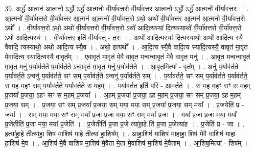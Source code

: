 \documentclass[17pt]{extarticle}
\begin{document}
39. अर्द्ध॑ आ॒त्मन॑ आ॒त्मनो ऽर्द्धो ऽर्द्ध॑ आ॒त्मनो॑ वी॒र्या॑वत्तरो वी॒र्या॑वत्तर आ॒त्मनो ऽर्द्धो ऽर्द्ध॑ आ॒त्मनो॑ वी॒र्या॑वत्तरः । . आ॒त्मनो॑ वी॒र्या॑वत्तरो वी॒र्या॑वत्तर आ॒त्मन॑ आ॒त्मनो॑ वी॒र्या॑वत्त॒रो ऽथो॒ अथो॑ वी॒र्या॑वत्तर आ॒त्मन॑ आ॒त्मनो॑ वी॒र्या॑वत्त॒रो ऽथो᳚ । . वी॒र्या॑वत्त॒रो ऽथो॒ अथो॑ वी॒र्या॑वत्तरो वी॒र्या॑वत्त॒रो ऽथो॑ आदि॒त्यस्या॑ दि॒त्यस्याथो॑ वी॒र्या॑वत्तरो वी॒र्या॑वत्त॒रो ऽथो॑ आदि॒त्यस्य॑ । . वी॒र्या॑वत्तर॒ इति॑ वी॒र्या॑वत् - त॒रः॒ । . अथो॑ आदि॒त्यस्या॑ दि॒त्यस्याथो॒ अथो॑ आदि॒त्य स्यै॒ वैवादि॒ त्यस्याथो॒ अथो॑ आदि॒त्य स्यै॒व । . अथो॒ इत्यथो᳚ । . आ॒दि॒त्य स्यै॒वै वादि॒त्य स्या॑दि॒त्यस्यै॒ वावृत॑ मा॒वृत॑ मे॒वादि॒त्य स्या॑दि॒त्यस्यै॒ वावृत᳚म् । . ए॒वावृत॑ मा॒वृत॑ मे॒वै वावृत॒ मन्वन्वा॒वृत॑ मे॒वै वावृत॒ मनु॑ । . आ॒वृत॒ मन्वन्वा॒वृत॑ मा॒वृत॒ मनु॑ प॒र्याव॑र्तते प॒र्याव॑र्त॒ते ऽन्वा॒वृत॑ मा॒वृत॒ मनु॑ प॒र्याव॑र्तते । . आ॒वृत॒मित्या᳚ - वृत᳚म् । . अनु॑ प॒र्याव॑र्तते प॒र्याव॑र्त॒ते ऽन्वनु॑ प॒र्याव॑र्तते॒ सꣳ सम् प॒र्याव॑र्त॒ते ऽन्वनु॑ प॒र्याव॑र्तते॒ सम् । . प॒र्याव॑र्तते॒ सꣳ सम् प॒र्याव॑र्तते प॒र्याव॑र्तते॒ स म॒ह म॒हꣳ सम् प॒र्याव॑र्तते प॒र्याव॑र्तते॒ स म॒हम् । . प॒र्याव॑र्तत॒ इति॑ परि - आव॑र्तते । . स म॒ह म॒हꣳ सꣳ स म॒हम् प्र॒जया᳚ प्र॒जया॒ ऽहꣳ सꣳ स म॒हम् प्र॒जया᳚ । . अ॒हम् प्र॒जया᳚ प्र॒जया॒ ऽह म॒हम् प्र॒जया॒ सꣳ सम् प्र॒जया॒ ऽह म॒हम् प्र॒जया॒ सम् । . प्र॒जया॒ सꣳ सम् प्र॒जया᳚ प्र॒जया॒ सम् मया॒ मया॒ सम् प्र॒जया᳚ प्र॒जया॒ सम् मया᳚ । . प्र॒जयेति॑ प्र - जया᳚ । . सम् मया॒ मया॒ सꣳ सम् मया᳚ प्र॒जा प्र॒जा मया॒ सꣳ सम् मया᳚ प्र॒जा । . मया᳚ प्र॒जा प्र॒जा मया॒ मया᳚ प्र॒जेतीति॑ प्र॒जा मया॒ मया᳚ प्र॒जेति॑ । . प्र॒जेतीति॑ प्र॒जा प्र॒जे त्या॑हा॒हे ति॑ प्र॒जा प्र॒जेत्या॑ह । . प्र॒जेति॑ प्र - जा । . इत्या॑हा॒हे तीत्या॑हा॒ शिष॑ मा॒शिष॑ मा॒हे तीत्या॑ हा॒शिष᳚म् । . आ॒हा॒शिष॑ मा॒शिष॑ माहाहा॒ शिष॑ मे॒वै वाशिष॑ माहा हा॒शिष॑ मे॒व । . आ॒शिष॑ मे॒वै वाशिष॑ मा॒शिष॑ मे॒वैता मे॒ता मे॒वाशिष॑ मा॒शिष॑ मे॒वैताम् । . आ॒शिष॒मित्या᳚ - शिष᳚म् । \newline
\pagebreak
{}
\end{document}
